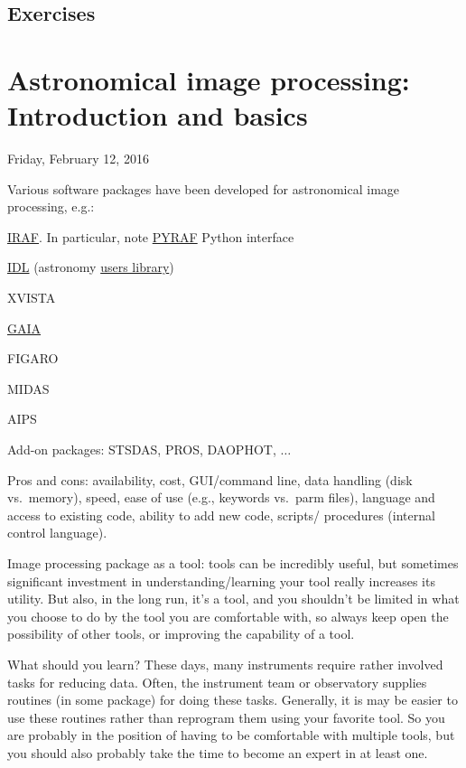 \documentclass{article}
\begin{document}
\subsection*{Exercises}

\section*{Astronomical image processing: Introduction and basics}
\textcolor{date}{Friday, February 12, 2016}

Various software packages have been developed for astronomical image
processing, e.g.:

\begin{itemize*}
    \item \href{http://iraf.noao.edu}{IRAF}.
        In particular, note
        \href{http://www.stsci.edu/institute/software_hardware/pyraf}
        {PYRAF} Python interface
    \item
        \href{http://www.harrisgeospatial.com/docs/using_idl_home.html}
        {IDL} (astronomy
        \href{http://idlastro.gsfc.nasa.gov/homepage.html}{users library})
    \item XVISTA
    \item \href{http://star-www.dur.ac.uk/~pdraper/gaia/gaia.html}{GAIA}
    \item FIGARO
    \item MIDAS
    \item AIPS
    \item Add-on packages: STSDAS, PROS, DAOPHOT, $\ldots$
\end{itemize*}
Pros and cons: availability, cost, GUI/command line, data handling
(disk vs.\ memory), speed, ease of use (e.g., keywords vs.\ parm files),
language and access to existing code, ability to add new code,
scripts/ procedures (internal control language).

Image processing package as a tool: tools can be incredibly useful,
but sometimes significant investment in understanding/learning your
tool really increases its utility. But also, in the long run, it's a
tool, and you shouldn't be limited in what you choose to do by the
tool you are comfortable with, so always keep open the possibility of
other tools, or improving the capability of a tool.

What should you learn? These days, many instruments require rather
involved tasks for reducing data. Often, the instrument team or
observatory supplies routines (in some package) for doing these tasks.
Generally, it is may be easier to use these routines rather than
reprogram them using your favorite tool. So you are probably in the
position of having to be comfortable with multiple tools, but you
should also probably take the time to become an expert in at least
one.
\end{document}
